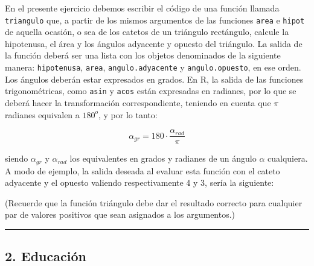 \documentclass[]{article}
\newenvironment{Shaded}{}{}
\newcommand{\KeywordTok}[1]{\textcolor[rgb]{0.00,0.44,0.13}{\textbf{{#1}}}}
\newcommand{\DecValTok}[1]{\textcolor[rgb]{0.25,0.63,0.44}{{#1}}}
\newcommand{\FloatTok}[1]{\textcolor[rgb]{0.25,0.63,0.44}{{#1}}}
\newcommand{\NormalTok}[1]{{#1}}
\begin{document}
En el presente ejercicio debemos escribir el código de una función
llamada \texttt{triangulo} que, a partir de los mismos argumentos de las
funciones \texttt{area} e \texttt{hipot} de aquella ocasión, o sea de
los catetos de un triángulo rectángulo, calcule la hipotenusa, el área y
los ángulos adyacente y opuesto del triángulo. La salida de la función
deberá ser una lista con los objetos denominados de la siguiente manera:
\texttt{hipotenusa}, \texttt{area}, \texttt{angulo.adyacente} y
\texttt{angulo.opuesto}, en ese orden. Los ángulos deberán estar
expresados en grados. En R, la salida de las funciones trigonométricas,
como \texttt{asin} y \texttt{acos} están expresadas en radianes, por lo
que se deberá hacer la transformación correspondiente, teniendo en
cuenta que $\pi$ radianes equivalen a $180^o$, y por lo tanto:

\[
  \alpha_{gr} = 180 \cdot \frac{\alpha_{rad}}{\pi}
\]

siendo $\alpha_{gr}$ y $\alpha_{rad}$ los equivalentes en grados y
radianes de un ángulo $\alpha$ cualquiera. A modo de ejemplo, la salida
deseada al evaluar esta función con el cateto adyacente y el opuesto
valiendo respectivamente 4 y 3, sería la siguiente:

\begin{Shaded}
\end{Shaded}

(Recuerde que la función triángulo debe dar el resultado correcto para
cualquier par de valores positivos que sean asignados a los argumentos.)

\begin{center}\rule{3in}{0.4pt}\end{center}

\subsection{2. Educación}
\end{document}
